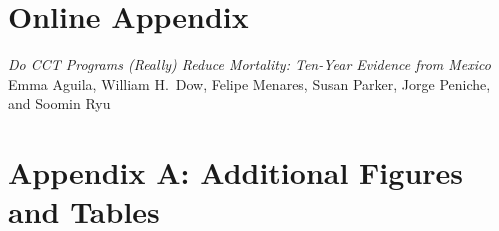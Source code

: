 \documentclass[12pt]{article}
\begin{document}
\newpage


\setcounter{secnumdepth}{0}
\bigskip
\singlespace
\renewcommand{\bibname}{References}
{\linespread{1.0}\selectfont}


\newpage



\newpage


\appendix

\newpage
\setcounter{page}{1}
\section*{Online Appendix}\label{appOnline}
\vspace{2cm}
\begin{center}
{\Large \it Do CCT Programs (Really) Reduce Mortality: Ten-Year Evidence from Mexico} \\[.4cm]
Emma Aguila, William H.\ Dow, Felipe Menares, Susan Parker, Jorge Peniche, and Soomin Ryu
\end{center}
\listoffigures
\listoftables

\newpage
\section*{Appendix A: Additional Figures and Tables}\label{appA}
\setcounter{table}{0}
\renewcommand{\thetable}{A.\arabic{table}}
\setcounter{figure}{0}
\renewcommand{\thefigure}{A.\arabic{figure}}
\renewcommand{\thesubsection}{\Alph{subsection}}




\end{document}
